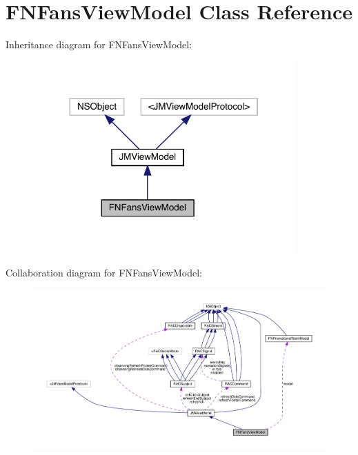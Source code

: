\hypertarget{interface_f_n_fans_view_model}{}\section{F\+N\+Fans\+View\+Model Class Reference}
\label{interface_f_n_fans_view_model}


Inheritance diagram for F\+N\+Fans\+View\+Model\+:\nopagebreak
\begin{figure}[H]
\begin{center}
\leavevmode
\includegraphics[width=284pt]{interface_f_n_fans_view_model__inherit__graph}
\end{center}
\end{figure}


Collaboration diagram for F\+N\+Fans\+View\+Model\+:\nopagebreak
\begin{figure}[H]
\begin{center}
\leavevmode
\includegraphics[width=350pt]{interface_f_n_fans_view_model__coll__graph}
\end{center}
\end{figure}
